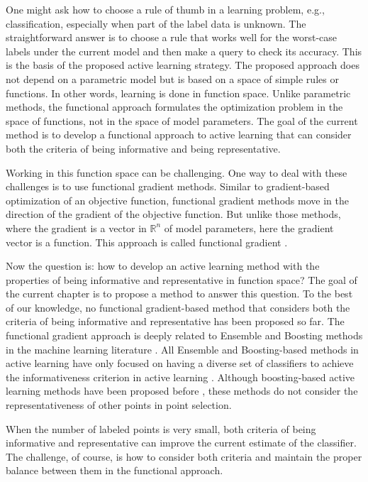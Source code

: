 \documentclass[12pt]{article}
\begin{document}
	One might ask how to choose a rule of thumb in a learning problem, e.g., classification, especially when part of the label data is unknown. The straightforward answer is to choose a rule that works well for the worst-case labels under the current model and then make a query to check its accuracy. This is the basis of the proposed active learning strategy. The proposed approach does not depend on a parametric model but is based on a space of simple rules or functions. In other words, learning is done in function space. Unlike parametric methods, the functional approach formulates the optimization problem in the space of functions, not in the space of model parameters. The goal of the current method is to develop a functional approach to active learning that can consider both the criteria of being informative and being representative.
	
	Working in this function space can be challenging. One way to deal with these challenges is to use functional gradient methods. Similar to gradient-based optimization of an objective function, functional gradient methods move in the direction of the gradient of the objective function. But unlike those methods, where the gradient is a vector in $\mathbb{R}^n$ of model parameters, here the gradient vector is a function. This approach is called functional gradient \cite{friedman2001greedy}.
	
	Now the question is: how to develop an active learning method with the properties of being informative and representative in function space? The goal of the current chapter is to propose a method to answer this question. To the best of our knowledge, no functional gradient-based method that considers both the criteria of being informative and representative has been proposed so far. The functional gradient approach is deeply related to Ensemble and Boosting methods in the machine learning literature \cite{friedman2001greedy}. All Ensemble and Boosting-based methods in active learning have only focused on having a diverse set of classifiers to achieve the informativeness criterion in active learning \cite{haas2017active}. Although boosting-based active learning methods have been proposed before \cite{schapire1997boosting}, these methods do not consider the representativeness of other points in point selection.
	
	When the number of labeled points is very small, both criteria of being informative and representative can improve the current estimate of the classifier. The challenge, of course, is how to consider both criteria and maintain the proper balance between them in the functional approach.
	
\end{document}

